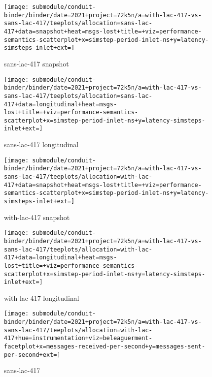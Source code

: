 \begin{figure*}[h]
    \centering
    \begin{subfigure}[b]{0.45\textwidth}
        \centering
        \texttt{[image: submodule/conduit-binder/binder/date=2021+project=72k5n/a=with-lac-417-vs-sans-lac-417/teeplots/allocation=sans-lac-417+data=snapshot+heat=msgs-lost+title=+viz=performance-semantics-scatterplot+x=simstep-period-inlet-ns+y=latency-simsteps-inlet+ext=]}
        \caption{sans-lac-417 snapshot}
        \label{fig:TODO}
      \end{subfigure}%
      \begin{subfigure}[b]{0.45\textwidth}
      \centering
      \texttt{[image: submodule/conduit-binder/binder/date=2021+project=72k5n/a=with-lac-417-vs-sans-lac-417/teeplots/allocation=sans-lac-417+data=longitudinal+heat=msgs-lost+title=+viz=performance-semantics-scatterplot+x=simstep-period-inlet-ns+y=latency-simsteps-inlet+ext=]}
      \caption{sans-lac-417 longitudinal}
      \label{fig:TODO}
    \end{subfigure}%

    \begin{subfigure}[b]{0.45\textwidth}
        \centering
        \texttt{[image: submodule/conduit-binder/binder/date=2021+project=72k5n/a=with-lac-417-vs-sans-lac-417/teeplots/allocation=with-lac-417+data=snapshot+heat=msgs-lost+title=+viz=performance-semantics-scatterplot+x=simstep-period-inlet-ns+y=latency-simsteps-inlet+ext=]}
        \caption{with-lac-417 snapshot}
        \label{fig:TODO}
    \end{subfigure}%
    \begin{subfigure}[b]{0.45\textwidth}
      \centering
      \texttt{[image: submodule/conduit-binder/binder/date=2021+project=72k5n/a=with-lac-417-vs-sans-lac-417/teeplots/allocation=with-lac-417+data=longitudinal+heat=msgs-lost+title=+viz=performance-semantics-scatterplot+x=simstep-period-inlet-ns+y=latency-simsteps-inlet+ext=]}
      \caption{with-lac-417 longitudinal}
      \label{fig:TODO}
    \end{subfigure}%

    \begin{subfigure}[b]{\textwidth}
      \centering
      \texttt{[image: submodule/conduit-binder/binder/date=2021+project=72k5n/a=with-lac-417-vs-sans-lac-417/teeplots/allocation=with-lac-417+hue=instrumentation+viz=beleaguerment-facetplot+x=messages-received-per-second+y=messages-sent-per-second+ext=]}
      \caption{sans-lac-417}
      \label{fig:TODO}
    \end{subfigure}


\end{figure*}
